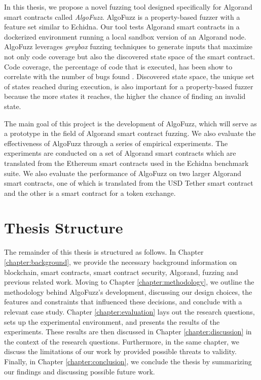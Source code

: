 In this thesis, we propose a novel fuzzing tool designed specifically for Algorand smart contracts called \textit{AlgoFuzz}.
AlgoFuzz is a property-based fuzzer with a feature set similar to Echidna.
Our tool tests Algorand smart contracts in a dockerized environment running a local sandbox version of an Algorand node.
AlgoFuzz leverages \textit{greybox} fuzzing techniques to generate inputs that maximize not only code coverage but also the discovered state space of the smart contract.
Code coverage, the percentage of code that is executed, has been show to correlate with the number of bugs found \cite{kochhar_code_2015}.
Discovered state space, the unique set of states reached during execution, is also important for a property-based fuzzer because the more states it reaches, the higher the chance of finding an invalid state.

The main goal of this project is the development of AlgoFuzz, which will serve as a prototype in the field of Algorand smart contract fuzzing.
We also evaluate the effectiveness of AlgoFuzz  through a series of empirical experiments.
The experiments are conducted on a set of Algorand smart contracts which are translated from the Ethereum smart contracts used in the Echidna benchmark suite.
We also evaluate the performance of AlgoFuzz on two larger Algorand smart contracts, one of which is translated from the USD Tether smart contract and the other is a smart contract for a token exchange.

\section*{Thesis Structure}
The remainder of this thesis is structured as follows.
In Chapter \ref{chapter:background}, we provide the necessary background information on blockchain, smart contracts, smart contract security, Algorand, fuzzing and previous related work.
Moving to Chapter \ref{chapter:methodology}, we outline the methodology behind AlgoFuzz's development, discussing our design choices, the features and constraints that influenced these decisions, and conclude with a relevant case study.
Chapter \ref{chapter:evaluation} lays out the research questions, sets up the experimental environment, and presents the results of the experiments.
These results are then discussed in Chapter \ref{chapter:discussion} in the context of the research questions. Furthermore, in the same chapter, we discuss the limitations of our work by provided possible threats to validity.
Finally, in Chapter \ref{chapter:conclusion}, we conclude the thesis by summarizing our findings and discussing possible future work.



